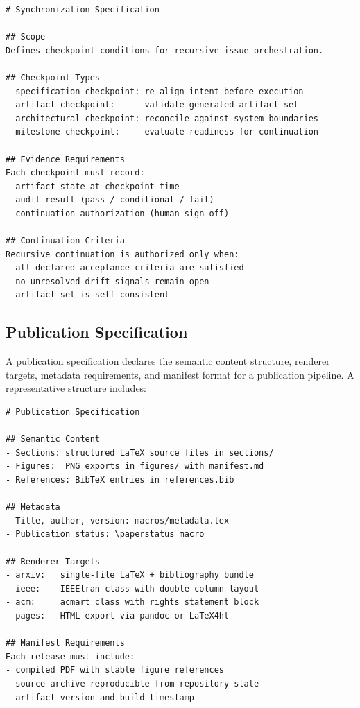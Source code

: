 \begin{lstlisting}[caption={Synchronization specification structure (Markdown front matter and body).}, label={lst:sync-spec}]
# Synchronization Specification

## Scope
Defines checkpoint conditions for recursive issue orchestration.

## Checkpoint Types
- specification-checkpoint: re-align intent before execution
- artifact-checkpoint:      validate generated artifact set
- architectural-checkpoint: reconcile against system boundaries
- milestone-checkpoint:     evaluate readiness for continuation

## Evidence Requirements
Each checkpoint must record:
- artifact state at checkpoint time
- audit result (pass / conditional / fail)
- continuation authorization (human sign-off)

## Continuation Criteria
Recursive continuation is authorized only when:
- all declared acceptance criteria are satisfied
- no unresolved drift signals remain open
- artifact set is self-consistent
\end{lstlisting}

\subsection{Publication Specification}

A publication specification declares the semantic content structure, renderer targets, metadata requirements, and manifest format for a publication pipeline. A representative structure includes:

\begin{lstlisting}[caption={Publication specification structure.}, label={lst:pub-spec}]
# Publication Specification

## Semantic Content
- Sections: structured LaTeX source files in sections/
- Figures:  PNG exports in figures/ with manifest.md
- References: BibTeX entries in references.bib

## Metadata
- Title, author, version: macros/metadata.tex
- Publication status: \paperstatus macro

## Renderer Targets
- arxiv:   single-file LaTeX + bibliography bundle
- ieee:    IEEEtran class with double-column layout
- acm:     acmart class with rights statement block
- pages:   HTML export via pandoc or LaTeX4ht

## Manifest Requirements
Each release must include:
- compiled PDF with stable figure references
- source archive reproducible from repository state
- artifact version and build timestamp
\end{lstlisting}

